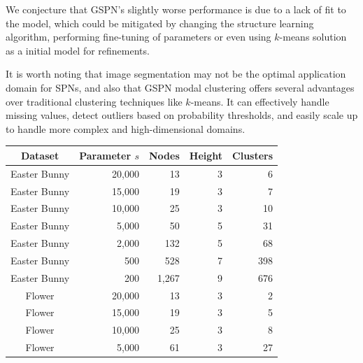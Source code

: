 We conjecture that GSPN's slightly worse performance is due to a lack of fit to the model, which could be mitigated by changing the structure learning algorithm, performing fine-tuning of parameters or even using $k$-means solution as a initial model for refinements.

It is worth noting that image segmentation may not be the optimal application domain for SPNs, and also that GSPN modal clustering offers several advantages over traditional clustering techniques like $k$-means. It can effectively handle missing values, detect outliers based on probability thresholds, and easily scale up to handle more complex and high-dimensional domains.

\begin{table}
  \centering

  \begin{tabular}{crrrr}
    \toprule
    \bfseries Dataset   & \bfseries Parameter $s$ & \bfseries Nodes & \bfseries Height & \bfseries Clusters \\ \midrule
    Easter Bunny        & 20,000                  & 13              & 3                & 6                  \\
    Easter Bunny        & 15,000                  & 19              & 3                & 7                  \\
    Easter Bunny        & 10,000                  & 25              & 3                & 10                 \\
    Easter Bunny        & 5,000                   & 50              & 5                & 31                 \\
    Easter Bunny        & 2,000                   & 132             & 5                & 68                 \\
    Easter Bunny        & 500                     & 528             & 7                & 398                \\
    Easter Bunny        & 200                     & 1,267           & 9                & 676                \\ \midrule
    Flower              & 20,000                  & 13              & 3                & 2                  \\
    Flower              & 15,000                  & 19              & 3                & 5                  \\
    Flower              & 10,000                  & 25              & 3                & 8                  \\
    Flower              & 5,000                   & 61              & 3                & 27                 \\

\end{tabular}
\end{table}

